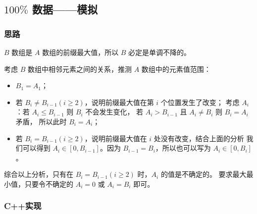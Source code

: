 
% 

\subsection{\texorpdfstring{$100\%$}{100\%} 数据——模拟}

\subsubsection{思路}

$B$ 数组是 $A$ 数组的前缀最大值，所以 $B$ 必定是单调不降的。

考虑 $B$ 数组中相邻元素之间的关系，推测 $A$ 数组中的元素值范围：

\begin{itemize}
      \item $B_1=A_1$；
      \item 若 $B_i\not=B_{i-1}(i\ge 2)$，说明前缀最大值在第 $i$ 个位置发生了改变；
            考虑 $A_i$：若 $A_i \le B_{i-1}$ 则 $B_i$ 不会发生变化，
            若 $A_i > B_{i-1}$ 且 $A_i\not=B_i$ 则 $B_i=A_i$ 矛盾，
            所以此时 $B_i=A_i$；
      \item 若 $B_i=B_{i-1}(i\ge 2)$，说明前缀最大值在 $i$ 处没有改变，结合上面的分析
            我们可以得到 $A_i \in [0, B_{i-1}]$。因为 $B_{i-1}=B_i$，所以也可以写为 $A_i \in [0, B_{i}]$。
\end{itemize}

综合以上分析，只有在 $B_{i}=B_{i-1}(i\ge 2)$ 时，$A_i$ 的值是不确定的。
要求最大最小值，只要令不确定的 $A_i=0$ 或 $A_i=B_{i}$ 即可。

\subsubsection{C++实现}

